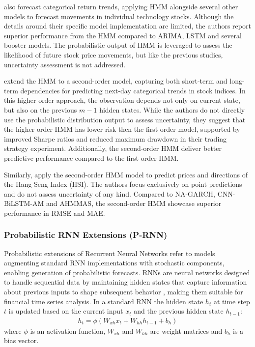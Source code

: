 \textcite{sher2023exploiting} also forecast categorical return trends, applying HMM alongside several other models to forecast movements in individual technology stocks. Although the details around their specific model implementation are limited, the authors report superior performance from the HMM compared to ARIMA, LSTM and several booster models. The probabilistic output of HMM is leveraged to assess the likelihood of future stock price movements, but like the previous studies, uncertainty assessment is not addressed. 

\textcite{zhang2019high} extend the HMM to a second-order model, capturing both short-term and long-term dependencies for predicting next-day categorical trends in stock indices. In this higher order approach, the observation depends not only on current state, but also on the previous $m-1$ hidden states. While the authors do not directly use the probabilistic distribution output to assess uncertainty, they suggest that the higher-order HMM has lower risk then the first-order model, supported by improved Sharpe ratios and reduced maximum drawdown in their trading strategy experiment. Additionally, the second-order HMM deliver better predictive performance compared to the first-order HMM.

\newpage
Similarly, \textcite{su2022hmm} apply the second-order HMM model to predict prices and directions of the Hang Seng Index (HSI). The authors focus exclusively on point predictions and do not assess uncertainty of any kind. Compared to NA-GARCH, CNN-BiLSTM-AM and AHMMAS, the second-order HMM showcase superior performance in RMSE and MAE. 




\subsubsection{Probabilistic RNN Extensions (P-RNN)}
\label{sec:prob_rnn}

Probabilistic extensions of Recurrent Neural Networks refer to models augmenting standard RNN implementations with stochastic components, enabling generation of probabilistic forecasts. RNNs are neural networks designed to handle sequential data by maintaining hidden states that capture information about previous inputs to shape subsequent behavior \parencite{Elman1990Finding}, making them suitable for financial time series analysis. In a standard RNN the hidden state $h_t$ at time step $t$ is updated based on the current input $x_t$ and the previous hidden state $h_{t-1}$:
\begin{equation}
    \begin{gathered}
        h_t = \phi(W_{xh}x_t + W_{hh}h_{t-1} + b_h)
    \end{gathered}
\end{equation}
where $\phi$ is an activation function, $W_{xh}$ and $W_{hh}$ are weight matrices and $b_h$ is a bias vector. 

